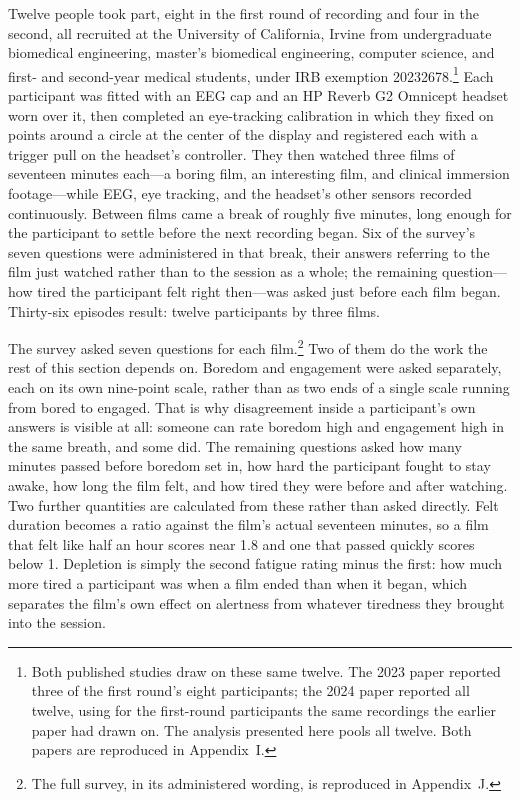 Twelve people took part, eight in the first round of recording and four in the second, all
recruited at the University of California, Irvine from undergraduate biomedical engineering,
master's biomedical engineering, computer science, and first- and second-year medical
students, under IRB exemption 20232678.\footnote{Both published studies draw on these same
twelve. The 2023 paper reported three of the first round's eight participants; the 2024 paper
reported all twelve, using for the first-round participants the same recordings the earlier
paper had drawn on. The analysis presented here pools all twelve. Both papers are reproduced
in Appendix~I.} Each participant was fitted with an EEG cap and an HP Reverb G2 Omnicept
headset worn over it, then completed an eye-tracking calibration in which they fixed on points
around a circle at the center of the display and registered each with a trigger pull on the
headset's controller. They then
watched three films of seventeen minutes each---a boring film, an interesting film, and
clinical immersion footage---while EEG, eye tracking, and the headset's other sensors recorded
continuously. Between films came a break of roughly five minutes, long enough for the
participant to settle before the next recording began. Six of the survey's seven questions
were administered in that break, their answers referring to the film just watched rather than
to the session as a whole; the remaining question---how tired the participant felt right
then---was asked just before each film began. Thirty-six episodes result: twelve participants
by three films.

The survey asked seven questions for each film.\footnote{The full survey, in its administered
wording, is reproduced in Appendix~J.} Two of them do the work the rest of this section depends on. Boredom and
engagement were asked separately, each on its own nine-point scale, rather than as two ends of a
single scale running from bored to engaged. That is why disagreement inside a participant's own
answers is visible at all: someone can rate boredom high and engagement high in the same breath,
and some did. The remaining questions asked how many minutes passed before boredom set in, how
hard the participant fought to stay awake, how long the film felt, and how tired they were
before and after watching. Two further quantities are calculated from these rather than asked
directly. Felt duration becomes a ratio against the film's actual seventeen minutes, so a film
that felt like half an hour scores near 1.8 and one that passed quickly scores below 1.
Depletion is simply the second fatigue rating minus the first: how much more tired a participant
was when a film ended than when it began, which separates the film's own effect on alertness
from whatever tiredness they brought into the session.

